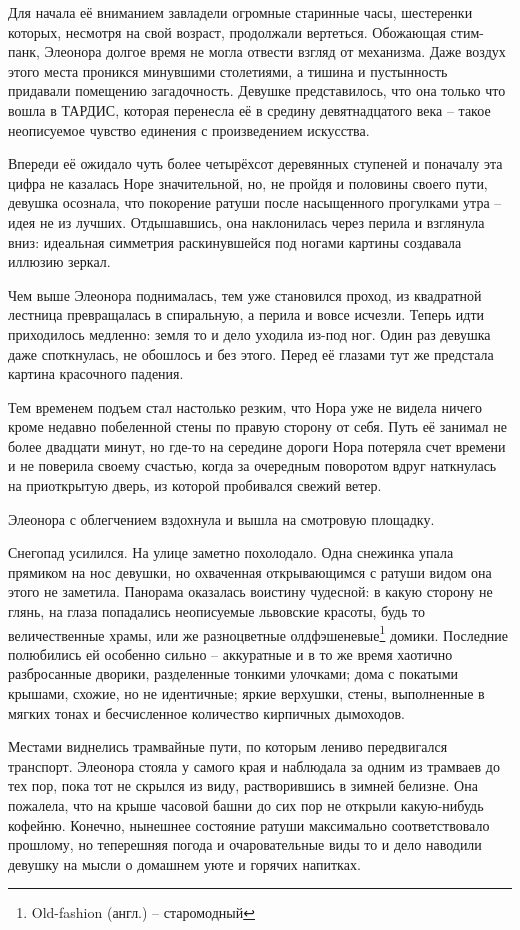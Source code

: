 \documentclass[
  a5paperpaper,
  DIV=11,
  numbers=noendperiod]{scrreprt}
\begin{document}
Для начала её вниманием завладели огромные старинные часы, шестеренки
которых, несмотря на свой возраст, продолжали вертеться. Обожающая
стим-панк, Элеонора долгое время не могла отвести взгляд от механизма.
Даже воздух этого места проникся минувшими столетиями, а тишина и
пустынность придавали помещению загадочность. Девушке представилось, что
она только что вошла в ТАРДИС, которая перенесла её в средину
девятнадцатого века -- такое неописуемое чувство единения с
произведением искусства.

Впереди её ожидало чуть более четырёхсот деревянных ступеней и поначалу
эта цифра не казалась Норе значительной, но, не пройдя и половины своего
пути, девушка осознала, что покорение ратуши после насыщенного
прогулками утра -- идея не из лучших. Отдышавшись, она наклонилась через
перила и взглянула вниз: идеальная симметрия раскинувшейся под ногами
картины создавала иллюзию зеркал.

Чем выше Элеонора поднималась, тем уже становился проход, из квадратной
лестница превращалась в спиральную, а перила и вовсе исчезли. Теперь
идти приходилось медленно: земля то и дело уходила из-под ног. Один раз
девушка даже споткнулась, не обошлось и без этого. Перед её глазами тут
же предстала картина красочного падения.

Тем временем подъем стал настолько резким, что Нора уже не видела ничего
кроме недавно побеленной стены по правую сторону от себя. Путь её
занимал не более двадцати минут, но где-то на середине дороги Нора
потеряла счет времени и не поверила своему счастью, когда за очередным
поворотом вдруг наткнулась на приоткрытую дверь, из которой пробивался
свежий ветер.

Элеонора с облегчением вздохнула и вышла на смотровую площадку.

Снегопад усилился. На улице заметно похолодало. Одна снежинка упала
прямиком на нос девушки, но охваченная открывающимся с ратуши видом она
этого не заметила. Панорама оказалась воистину чудесной: в какую сторону
не глянь, на глаза попадались неописуемые львовские красоты, будь то
величественные храмы, или же разноцветные олдфэшеневые\footnote{Old-fashion
  (англ.) -- старомодный} домики. Последние полюбились ей особенно
сильно -- аккуратные и в то же время хаотично разбросанные дворики,
разделенные тонкими улочками; дома с покатыми крышами, схожие, но не
идентичные; яркие верхушки, стены, выполненные в мягких тонах и
бесчисленное количество кирпичных дымоходов.

Местами виднелись трамвайные пути, по которым лениво передвигался
транспорт. Элеонора стояла у самого края и наблюдала за одним из
трамваев до тех пор, пока тот не скрылся из виду, растворившись в зимней
белизне. Она пожалела, что на крыше часовой башни до сих пор не открыли
какую-нибудь кофейню. Конечно, нынешнее состояние ратуши максимально
соответствовало прошлому, но теперешняя погода и очаровательные виды то
и дело наводили девушку на мысли о домашнем уюте и горячих напитках.
\end{document}
